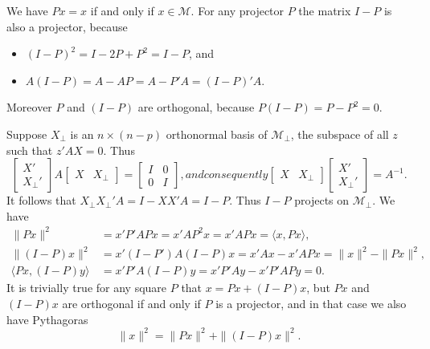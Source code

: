 \documentclass[
  12pt,
  letterpaper,
  DIV=11,
  numbers=noendperiod]{scrartcl}
\providecommand{\tightlist}{%
  \setlength{\itemsep}{0pt}\setlength{\parskip}{0pt}}
\begin{document}
We have \(Px=x\) if and only if \(x\in\mathcal{M}\). For any projector
\(P\) the matrix \(I-P\) is also a projector, because

\begin{itemize}
\tightlist
\item
  \((I-P)^2=I-2P+P^2=I-P\), and
\item
  \(A(I-P)=A-AP=A-P'A=(I-P)'A\).
\end{itemize}

Moreover \(P\) and \((I-P)\) are orthogonal, because \(P(I-P)=P-P^2=0\).

Suppose \(X_\perp\) is an \(n\times(n-p)\) orthonormal basis of
\(\mathcal{M}_\perp\), the subspace of all \(z\) such that \(z'AX=0\).
Thus \begin{subequations}
\begin{equation}
\begin{bmatrix}X'\\ X_\perp'\end{bmatrix}A\begin{bmatrix}X&X_\perp\end{bmatrix}=\begin{bmatrix}I&0\\0&I\end{bmatrix},
\end{equation}
and consequently
\begin{equation}
\begin{bmatrix}X&X_\perp\end{bmatrix}\begin{bmatrix}X'\\ X_\perp'\end{bmatrix}=A^{-1}.
\end{equation}
\end{subequations} It follows that \(X_\perp X_\perp'A=I-XX'A=I-P\).
Thus \(I-P\) projects on \(\mathcal{M}_\perp\). We have \begin{align}
\|Px\|^2&=x'P'APx=x'AP^2x=x'APx=\langle x, Px\rangle,\\
\|(I-P)x\|^2&=x'(I-P')A(I-P)x=x'Ax-x'APx=\|x\|^2-\|Px\|^2,\\
\langle Px, (I-P)y\rangle&=x'P'A(I-P)y=x'P'Ay-x'P'APy=0.
\end{align} It is trivially true for any square \(P\) that
\(x=Px+(I-P)x\), but \(Px\) and \((I-P)x\) are orthogonal if and only if
\(P\) is a projector, and in that case we also have Pythagoras
\begin{equation}
\|x\|^2=\|Px\|^2+\|(I-P)x\|^2.
\end{equation}
\end{document}
